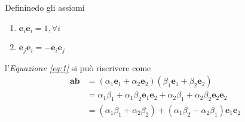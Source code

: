 \begin{frame}
    Defininedo gli assiomi 
    \begin{enumerate}
        \item \(\mathbf{e}_{i}\mathbf{e}_{i} = 1, \forall i\) 
        \item \(\mathbf{e}_{j}\mathbf{e}_{i} = -\mathbf{e}_{i}\mathbf{e}_{j}\)
    \end{enumerate}
    l'\emph{Equazione \ref{eq:1}} si può riscrivere come
    \[\begin{aligned}
        \mathbf{ab} & = (\alpha_{1}\mathbf{e}_{1} + \alpha_{2}\mathbf{e}_{2})
                (\beta_{1}\mathbf{e}_{1} + \beta_{2}\mathbf{e}_{2}) \\
                & = \alpha_{1}\beta_{1}
                + \alpha_{1}\beta_{2}\mathbf{e}_{1}\mathbf{e}_{2}
                + \alpha_{2}\beta_{1} 
                + \alpha_{2}\beta_{2}\mathbf{e}_{2}\mathbf{e}_{2} \\
                & = (\alpha_{1}\beta_{1} + \alpha_{2}\beta_{2})
                + (\alpha_{1}\beta_{2} - \alpha_{2}\beta_{1})\mathbf{e}_{1}\mathbf{e}_{2}
    \end{aligned}\]
\end{frame}

